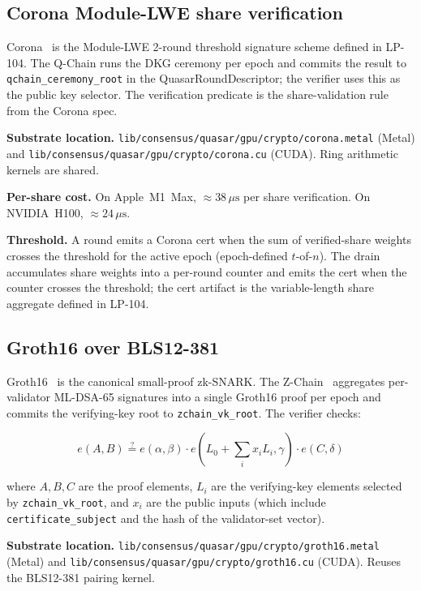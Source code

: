 \subsection{Corona Module-LWE share verification}

Corona~\cite{corona} is the Module-LWE 2-round threshold
signature scheme defined in LP-104. The Q-Chain runs the DKG ceremony
per epoch and commits the result to \texttt{qchain\_ceremony\_root} in
the QuasarRoundDescriptor; the verifier uses this as the public key
selector. The verification predicate is the share-validation rule from
the Corona spec.

\textbf{Substrate location.}
\texttt{lib/consensus/quasar/gpu/crypto/corona.metal} (Metal) and
\texttt{lib/consensus/quasar/gpu/crypto/corona.cu} (CUDA). Ring
arithmetic kernels are shared.

\textbf{Per-share cost.} On Apple~M1~Max, $\approx 38\,\mu\text{s}$ per
share verification. On NVIDIA~H100, $\approx 24\,\mu\text{s}$.

\textbf{Threshold.} A round emits a Corona cert when the sum of
verified-share weights crosses the threshold for the active epoch
(epoch-defined $t$-of-$n$). The drain accumulates share weights into
a per-round counter and emits the cert when the counter crosses the
threshold; the cert artifact is the variable-length share aggregate
defined in LP-104.

\subsection{Groth16 over BLS12-381}

Groth16~\cite{groth2016} is the canonical small-proof zk-SNARK. The
Z-Chain~\cite{quasar2025} aggregates per-validator ML-DSA-65
signatures into a single Groth16 proof per epoch and commits the
verifying-key root to \texttt{zchain\_vk\_root}. The verifier checks:

\[
e(A, B) \stackrel{?}{=} e(\alpha, \beta) \cdot e(L_0 + \sum_i x_i L_i, \gamma) \cdot e(C, \delta)
\]

where $A, B, C$ are the proof elements, $L_i$ are the verifying-key
elements selected by \texttt{zchain\_vk\_root}, and $x_i$ are the
public inputs (which include \texttt{certificate\_subject} and the
hash of the validator-set vector).

\textbf{Substrate location.}
\texttt{lib/consensus/quasar/gpu/crypto/groth16.metal} (Metal) and
\texttt{lib/consensus/quasar/gpu/crypto/groth16.cu} (CUDA). Reuses the
BLS12-381 pairing kernel.

